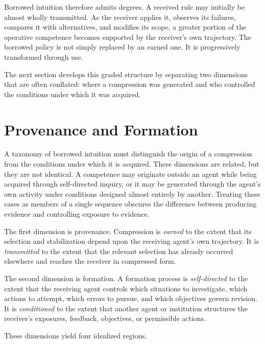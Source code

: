 \documentclass[11pt]{article}
\begin{document}
Borrowed intuition therefore admits degrees. A received rule may initially be almost wholly transmitted. As the receiver applies it, observes its failures, compares it with alternatives, and modifies its scope, a greater portion of the operative competence becomes supported by the receiver's own trajectory. The borrowed policy is not simply replaced by an earned one. It is progressively transformed through use.

The next section develops this graded structure by separating two dimensions that are often conflated: where a compression was generated and who controlled the conditions under which it was acquired.

\section{Provenance and Formation}

A taxonomy of borrowed intuition must distinguish the origin of a compression from the conditions under which it is acquired. These dimensions are related, but they are not identical. A competence may originate outside an agent while being acquired through self-directed inquiry, or it may be generated through the agent's own activity under conditions designed almost entirely by another. Treating these cases as members of a single sequence obscures the difference between producing evidence and controlling exposure to evidence.

The first dimension is provenance. Compression is \emph{earned} to the extent that its selection and stabilization depend upon the receiving agent's own trajectory. It is \emph{transmitted} to the extent that the relevant selection has already occurred elsewhere and reaches the receiver in compressed form.

The second dimension is formation. A formation process is \emph{self-directed} to the extent that the receiving agent controls which situations to investigate, which actions to attempt, which errors to pursue, and which objectives govern revision. It is \emph{conditioned} to the extent that another agent or institution structures the receiver's exposures, feedback, objectives, or permissible actions.

These dimensions yield four idealized regions.
\end{document}
